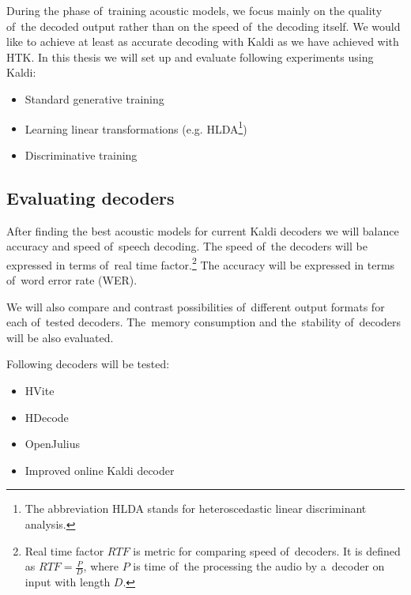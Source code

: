 During the phase of~training acoustic models, we focus mainly on the quality of~the decoded output rather than on the speed of~the decoding itself. 
We would like to achieve at least as accurate decoding with Kaldi as we have achieved with HTK. In this thesis we will set up and evaluate following experiments using Kaldi:
\begin{itemize}
    \item Standard generative training
    \item Learning linear transformations (e.g. HLDA\footnote{The abbreviation HLDA stands for heteroscedastic linear discriminant analysis.})
    \item Discriminative training 
\end{itemize}
 

\subsection{Evaluating decoders} 
\label{sub:compare_rt}
After finding the best acoustic models for current Kaldi decoders we will balance accuracy and speed of~speech decoding.
The speed of~the decoders will be expressed in terms of~real time factor.\footnote{Real time factor $RTF$ is metric for comparing speed of~decoders. It is defined as $RTF = \frac{P}{D}$, where $P$ is time of~the processing the audio by a~decoder on input with length $D$.} The accuracy will be expressed in terms of~word error rate (WER).

We will also compare and contrast possibilities of~different output formats for each of~tested decoders. The~memory consumption and the~stability of~decoders will be also evaluated. 

Following decoders will be tested:
\begin{itemize}
    \item HVite
    \item HDecode
    \item OpenJulius
    \item Improved online Kaldi decoder
\end{itemize}


